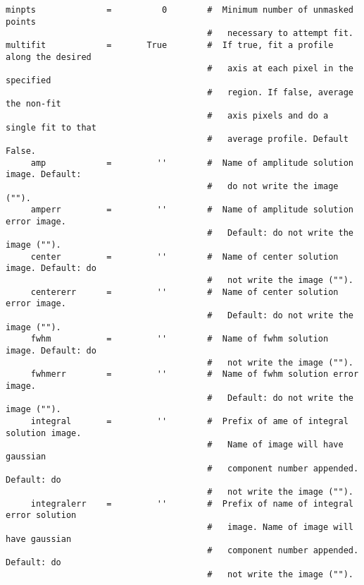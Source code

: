 \begin{verbatim}
minpts              =          0        #  Minimum number of unmasked points
                                        #   necessary to attempt fit.
multifit            =       True        #  If true, fit a profile along the desired
                                        #   axis at each pixel in the specified
                                        #   region. If false, average the non-fit
                                        #   axis pixels and do a single fit to that
                                        #   average profile. Default False.
     amp            =         ''        #  Name of amplitude solution image. Default:
                                        #   do not write the image ("").
     amperr         =         ''        #  Name of amplitude solution error image.
                                        #   Default: do not write the image ("").
     center         =         ''        #  Name of center solution image. Default: do
                                        #   not write the image ("").
     centererr      =         ''        #  Name of center solution error image.
                                        #   Default: do not write the image ("").
     fwhm           =         ''        #  Name of fwhm solution image. Default: do
                                        #   not write the image ("").
     fwhmerr        =         ''        #  Name of fwhm solution error image.
                                        #   Default: do not write the image ("").
     integral       =         ''        #  Prefix of ame of integral solution image.
                                        #   Name of image will have gaussian
                                        #   component number appended.  Default: do
                                        #   not write the image ("").
     integralerr    =         ''        #  Prefix of name of integral error solution
                                        #   image. Name of image will have gaussian
                                        #   component number appended.  Default: do
                                        #   not write the image ("").


\end{verbatim}
